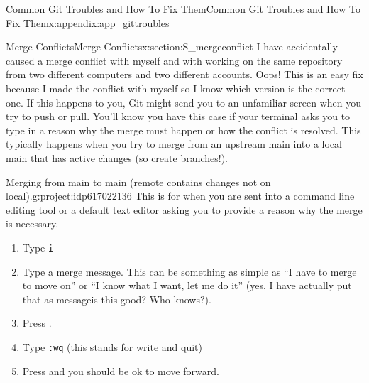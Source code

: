 \documentclass[oneside,10pt,]{book}
\newcommand{\mono}[1]{\texttt{#1}}
\newcommand{\kbd}[1]{\keys{{#1}}}
\begin{document}
\begin{appendixptx}{Common Git Troubles and How To Fix Them}{}{Common Git Troubles and How To Fix Them}{}{}{x:appendix:app_gittroubles}
\begin{sectionptx}{Merge Conflicts}{}{Merge Conflicts}{}{}{x:section:S_mergeconflict}
I have accidentally caused a merge conflict with myself and with working on the same repository from two different computers and two different accounts. Oops! This is an easy fix because I made the conflict with myself so I know which version is the correct one. If this happens to you, Git might send you to an unfamiliar screen when you try to push or pull. You'll know you have this case if your terminal asks you to type in a reason why the merge must happen or how the conflict is resolved. This typically happens when you try to merge from an upstream main into a local main that has active changes (so create branches!).%
\begin{project}{Merging from main to main (remote contains changes not on local).}{g:project:idp617022136}%
This is for when you are sent into a command line editing tool or a default text editor asking you to provide a reason why the merge is necessary.%
\begin{enumerate}[font=\bfseries,label=(\alph*),ref=\alph*]
\item{}Type \mono{i}%
\item{}Type a merge message. This can be something as simple as ``I have to merge to move on'' or ``I know what I want, let me do it'' (yes, I have actually put that as message\textellipsis{}is this good? Who knows?).%
\item{}Press \kbd{esc}.%
\item{}Type \mono{:wq} (this stands for write and quit)%
\item{}Press \kbd{Enter} and you should be ok to move forward.%
\end{enumerate}
\end{project}%
\end{sectionptx}
\end{appendixptx}
%
%
\typeout{************************************************}
\typeout{************************************************}
%
\end{document}
